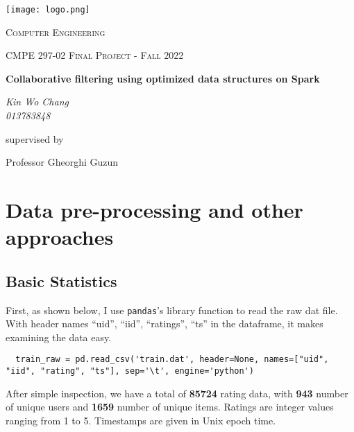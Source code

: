 \documentclass{scrartcl}
\begin{document}
\lstset{language=Python}
\begin{titlepage}
	\centering
	\texttt{[image: logo.png]}\par
	\vspace{2cm}
	{\scshape\LARGE Computer Engineering \par}  %
	\vspace{1cm}
	{\scshape\Large CMPE 297-02 Final Project - Fall 2022\par}
	\vfill
	
	{\huge\bfseries Collaborative filtering using optimized data structures on Spark \par}
	\vfill
	
	{\Large\itshape Kin Wo Chang \\ 013783848}\par
	\vspace{1.5cm}

	\vfill
	supervised by\par
	Professor Gheorghi Guzun


	\vfill
\end{titlepage}

\newpage

\doublespacing
\tableofcontents
\singlespacing

\newpage

\doublespacing

\section{Data pre-processing and other approaches}

\subsection{Basic Statistics}
First, as shown below, I use \texttt{pandas}'s library function to read the raw dat file. With header names ``uid'', ``iid'', ``ratings'', ``ts'' in the dataframe, it makes examining the data easy. \\
\begin{lstlisting}
  train_raw = pd.read_csv('train.dat', header=None, names=["uid", "iid", "rating", "ts"], sep='\t', engine='python')
\end{lstlisting}
After simple inspection, we have a total of \textbf{85724} rating data, with \textbf{943} number of unique users and \textbf{1659} number of unique items. Ratings are integer values ranging from 1 to 5. Timestamps are given in Unix epoch time.
\end{document}
